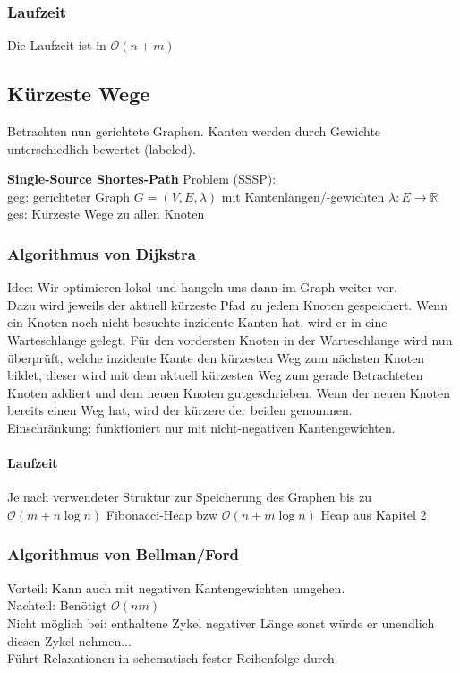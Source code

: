 \documentclass{scrartcl}
\begin{document}
\subsubsection{Laufzeit}
Die Laufzeit ist in $\mathcal{O}(n+m)$

\subsection{Kürzeste Wege}
Betrachten nun gerichtete Graphen. Kanten werden durch Gewichte unterschiedlich bewertet (labeled). \\
\begin{shaded}
\textbf{Single-Source Shortes-Path} Problem {\tiny (SSSP)}:\\
geg: gerichteter Graph $G=(V,E,\lambda)$ mit Kantenlängen/-gewichten $\lambda:E\to\mathds{R}$\\
ges: Kürzeste Wege zu allen Knoten
\end{shaded}

\subsubsection{Algorithmus von \textbf{Dijkstra}}
Idee: Wir optimieren lokal und hangeln uns dann im Graph weiter vor.\\
Dazu wird jeweils der aktuell kürzeste Pfad zu jedem Knoten gespeichert. Wenn ein Knoten noch nicht besuchte inzidente Kanten hat, wird er in eine Warteschlange gelegt. Für den vordersten Knoten in der Warteschlange wird nun überprüft, welche inzidente Kante den kürzesten Weg zum nächsten Knoten bildet, dieser wird mit dem aktuell kürzesten Weg zum gerade Betrachteten Knoten addiert und dem neuen Knoten gutgeschrieben. Wenn der neuen Knoten bereits einen Weg hat, wird der kürzere der beiden genommen.\\ Einschränkung: funktioniert nur mit nicht-negativen Kantengewichten.
\paragraph{Laufzeit} Je nach verwendeter Struktur zur Speicherung des Graphen bis zu $\mathcal{O}(m+n\log n)$ {\tiny Fibonacci-Heap} bzw $\mathcal{O}(n+m\log n)$ {\tiny Heap aus Kapitel 2}

\subsubsection{Algorithmus von \textbf{Bellman/Ford}}
Vorteil: Kann auch mit negativen Kantengewichten umgehen.\\
Nachteil: Benötigt $\mathcal{O}(nm)$ \\
Nicht möglich bei: enthaltene Zykel negativer Länge {\tiny sonst würde er unendlich diesen Zykel nehmen...} \\
Führt Relaxationen in schematisch fester Reihenfolge durch.
\end{document}
